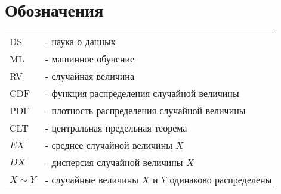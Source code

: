 \chapter*{Обозначения}

\begin{tabular}{ l l }
 DS & - наука о данных \\ 
 ML & - машинное обучение \\ 
 RV & - случайная величина \\
 CDF & - функция распределения случайной величины \\
 PDF & - плотность распределения случайной величины \\
 CLT & - центральная предельная теорема \\
 $EX$ & - среднее случайной величины $X$ \\
 $DX$ & - дисперсия случайной величины $X$ \\
 $X \sim Y$ & - случайные величины $X$ и $Y$ одинаково распределены
\end{tabular}
